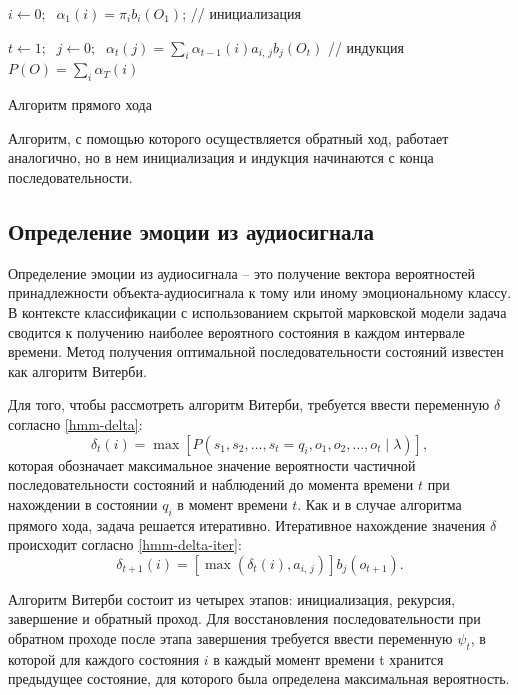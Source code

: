 \begin{algorithm}[H]
	$i \leftarrow 0;\;$
	{
		$\alpha_1(i) = \pi_ib_i(O_1)$; // инициализация
	}

	$t \leftarrow 1;\;$
	{
		$j \leftarrow 0;\;$
		{
			$\alpha_t(j) = \displaystyle\sum_i\alpha_{t - 1}(i)a_{i,\,j}b_j(O_t)$ // индукция
		}
	}
	$P(O) = \displaystyle\sum_i\alpha_T(i)$
	\caption{Алгоритм прямого хода}
	\label{alg:forward}
\end{algorithm}
Алгоритм, с помощью которого осуществляется обратный ход, работает аналогично, но в нем инициализация и индукция начинаются с конца последовательности.
\subsection{Определение эмоции из аудиосигнала}
Определение эмоции из аудиосигнала -- это получение вектора вероятностей принадлежности объекта-аудиосигнала к тому или иному эмоциональному классу. В контексте классификации с использованием скрытой марковской модели задача сводится к получению наиболее вероятного состояния в каждом интервале времени. Метод получения оптимальной последовательности состояний известен как алгоритм Витерби.

Для того, чтобы рассмотреть алгоритм Витерби, требуется ввести переменную $\delta$ согласно \ref{hmm-delta}:
\begin{equation}\label{hmm-delta}
	\delta_t(i) = \max\left[P(s_1, s_2, \dots, s_t = q_i, o_1, o_2, \dots, o_t\;|\;\lambda)\right],
\end{equation}
которая обозначает максимальное значение вероятности частичной последовательности состояний и наблюдений до момента времени $t$ при нахождении в состоянии $q_i$ в момент времени $t$. Как и в случае алгоритма прямого хода, задача решается итеративно. Итеративное нахождение значения $\delta$ происходит согласно \ref{hmm-delta-iter}:
\begin{equation}\label{hmm-delta-iter}
	\delta_{t + 1}(i) = \left[\max\left(\delta_t(i), a_{i,\,j}\right)\right]b_j(o_{t+1}).
\end{equation}

Алгоритм Витерби состоит из четырех этапов: инициализация, рекурсия, завершение и обратный проход. Для восстановления последовательности при обратном проходе после этапа завершения требуется ввести переменную $\psi_t$, в которой для каждого состояния $i$ в каждый момент времени t хранится предыдущее состояние, для которого была определена максимальная вероятность. 


